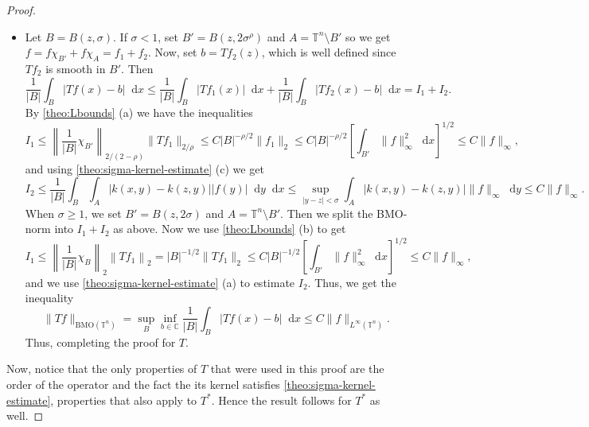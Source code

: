 \documentclass[12pt, reqno]{amsart}
\theoremstyle{definition}
\theoremstyle{remark}
\numberwithin{equation}{section}
\newcommand*\diff{\mathop{}\!\mathrm{d}}
\begin{document}
\begin{proof}
\begin{itemize}
        \item[(c)] Let $B = B(z, \sigma)$. If $\sigma < 1$, set $B'=B(z, 2\sigma^\rho)$ and $A = \mathbb{T}^n\setminus B'$ so we get $f = f\chi_{B'} + f\chi_A = f_1 + f_2$. Now, set $b = Tf_2(z)$, which is well defined since $Tf_2$ is smooth in $B'$. Then 
        \begin{equation*}
            \frac{1}{|B|}\int_B|Tf(x) - b| \diff x \leq \frac{1}{|B|}\int_B|Tf_1(x)|\diff x + \frac{1}{|B|}\int_B|Tf_2(x) -b|\diff x = I_1 + I_2.
        \end{equation*}
        By \cref{theo:Lbounds} (a) we have the inequalities
        \begin{equation*}
            I_1 \leq \left\|\frac{1}{|B|}\chi_{B'}\right\|_{2/(2-\rho)}\|Tf_1\|_{2/\rho}\leq C|B|^{-\rho/2}\|f_1\|_2 \leq C|B|^{-\rho/2}\left[\int_{B'}\|f\|^2_\infty\diff x\right]^{1/2} \leq C \|f\|_\infty,
        \end{equation*}
        and using \cref{theo:sigma-kernel-estimate} (c) we get 
        \begin{equation*}
            I_2 \leq \frac{1}{|B|}\int_B\int_A|k(x, y) - k(z, y)||f(y)|\diff y \diff x \leq \sup_{|y-z|<\sigma}\int_A|k(x, y) - k(z, y)|\|f\|_\infty \diff y \leq C \|f\|_\infty.
        \end{equation*}
        When $\sigma \geq 1$, we set $B'=B(z, 2\sigma)$ and $A = \mathbb{T}^n\setminus B'$. Then we split the BMO-norm into $I_1 + I_2$ as above. Now we use \cref{theo:Lbounds} (b) to get
        \begin{equation*}
            I_1 \leq \left\|\frac{1}{|B|}\chi_B\right\|_2\left\|Tf_1\right\|_2 = |B|^{-1/2}\|Tf_1\|_2 \leq C|B|^{-1/2}\left[\int_{B'}\|f\|^2_\infty\diff x\right]^{1/2} \leq C \|f\|_\infty,
        \end{equation*}
        and we use \cref{theo:sigma-kernel-estimate} (a) to estimate $I_2$. Thus, we get the inequality
        \begin{equation*}
            \|Tf\|_{\mathrm{BMO}(\mathbb{T}^n)} = \sup_B \inf_{b\in \mathbb{C}} \frac{1}{|B|} \int_B |Tf(x) - b|\diff x \leq C\|f\|_{L^\infty(\mathbb{T}^n)}.
        \end{equation*}
        Thus, completing the proof for $T$. 
    \end{itemize}  
    Now, notice that the only properties of $T$ that were used in this proof are the order of the operator and the fact the its kernel satisfies \cref{theo:sigma-kernel-estimate}, properties that also apply to $T^*$. Hence the result follows for $T^*$ as well.
\end{proof}
\end{document}
